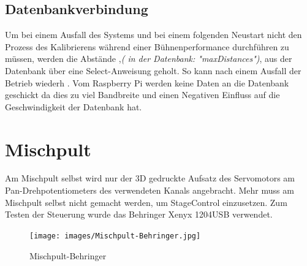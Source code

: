 \subsection{Datenbankverbindung}
Um bei einem Ausfall des Systems und bei einem folgenden Neustart nicht den Prozess des Kalibrierens während einer Bühnenperformance durchführen zu müssen, werden die Abstände ,\textit{( in der Datenbank: "maxDistances")}, aus der Datenbank über eine Select-Anweisung geholt. So kann nach einem Ausfall der Betrieb wiederh . Vom Raspberry Pi werden keine Daten an die Datenbank geschickt da dies zu viel Bandbreite und einen Negativen Einfluss auf die Geschwindigkeit der Datenbank hat.

\section{Mischpult}
Am Mischpult selbst wird nur der 3D gedruckte Aufsatz des Servomotors am Pan-Drehpotentiometers des verwendeten Kanals angebracht. Mehr muss am Mischpult selbst nicht gemacht werden, um StageControl einzusetzen. Zum Testen der Steuerung wurde das Behringer Xenyx 1204USB verwendet.


\begin{figure}[H]
	\centering
	\texttt{[image: images/Mischpult-Behringer.jpg]}
	\caption[Mischpult-Behringer]{Mischpult-Behringer}
	\label{fig: Mischpult-Behringer}
\end{figure}
